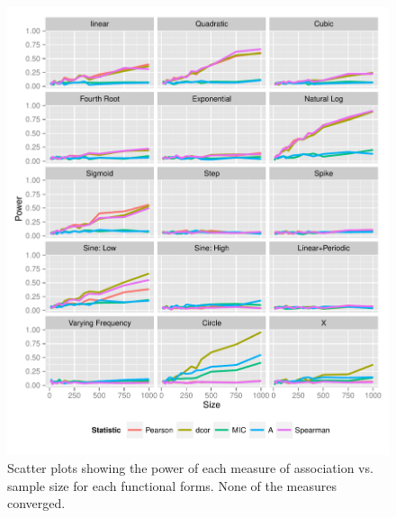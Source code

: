 \documentclass[a4paper, 12pt]{report}
\begin{document}
\begin{figure}[H]
\begin{centering}
\includegraphics[width=\textwidth]{powerSizeNoise30Beta25.pdf}
\caption{Scatter plots showing the power of each measure of association vs. sample size for each functional forms. None of the measures converged.} 
\label{F:powerSizeBN30}
\end{centering}
\end{figure}
\end{document}
